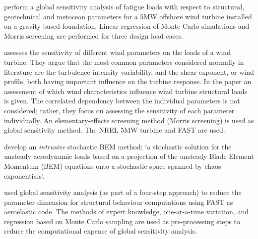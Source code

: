 \cite{Velarde2019} perform a global sensitivity analysis of fatigue loads with respect to structural, geotechnical and metocean parameters for a 5MW offshore wind turbine installed on a gravity based foundation. Linear regression of Monte Carlo simulations and Morris screening are performed for three design load cases. 

\cite{Robertson2018} assesses the sensitivity of different wind parameters on the loads of a wind turbine. They argue that the most common parameters considered normally in literature are the turbulence intensity variability, and the shear exponent, or wind profile, both having important influence on the turbine response. In the paper an assessment of which wind characteristics influence wind turbine structural loads is given. The correlated dependency between the individual parameters is not considered; rather, they focus on assessing the sensitivity of each parameter individually. An elementary-effects screening method (Morris screening) is used as global sensitivity method. The NREL 5MW turbine and FAST are used.

\cite{Fluck2018} develop an \textit{intrusive} stochastic BEM method: `a stochastic solution for the unsteady aerodynamic loads based on a projection of the unsteady Blade Element Momentum (BEM) equations onto a stochastic space spanned by chaos exponentials'.

\cite{Hubler2017} used global sensitivity analysis (as part of a four-step approach) to reduce the parameter dimension for structural behaviour computations using FAST as aeroelastic code. The methods of expert knowledge, one-at-a-time variation, and regression based on Monte Carlo sampling are used as pre-processing steps to reduce the computational expense of global sensitivity analysis.